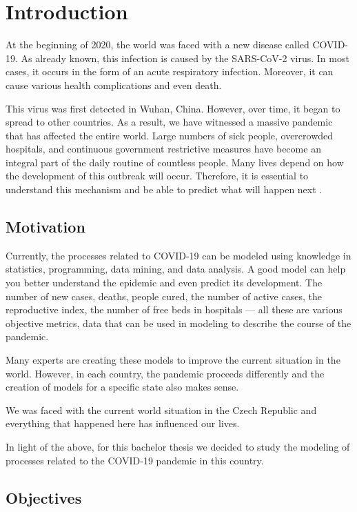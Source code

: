 \chapter{Introduction}
At the beginning of 2020, the world was faced with a new disease called COVID-19. As already known, this infection is caused by the SARS-CoV-2 virus. In most cases, it occurs in the form of an acute respiratory infection. Moreover, it can cause various health complications and even death.

This virus was first detected in Wuhan, China. However, over time, it began to spread to other countries. As a result, we have witnessed a massive pandemic that has affected the entire world. Large numbers of sick people, overcrowded hospitals, and continuous government restrictive measures have become an integral part of the daily routine of countless people. Many lives depend on how the development of this outbreak will occur. Therefore, it is essential to understand this mechanism and be able to predict what will happen next \cite{Hu2021}. 

\section{Motivation}

Currently, the processes related to COVID-19 can be modeled using knowledge in statistics, programming, data mining, and data analysis. A good model can help you better understand the epidemic and even predict its development. The number of new cases, deaths, people cured, the number of active cases, the reproductive index, the number of free beds in hospitals --- all these are various objective metrics, data that can be used in modeling to describe the course of the pandemic.

Many experts are creating these models to improve the current situation in the world. However, in each country, the pandemic proceeds differently and the creation of models for a specific state also makes sense.

We was faced with the current world situation in the Czech Republic and everything that happened here has influenced our lives.

In light of the above, for this bachelor thesis we decided to study the modeling of processes related to the COVID-19 pandemic in this country.

\section{Objectives}

